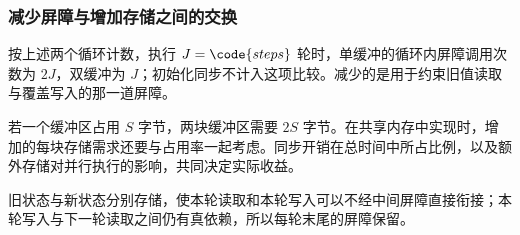 \subsubsection{减少屏障与增加存储之间的交换}
按上述两个循环计数，执行 $J=\code{steps}$ 轮时，单缓冲的循环内屏障调用次数为 $2J$，双缓冲为 $J$；初始化同步不计入这项比较。减少的是用于约束旧值读取与覆盖写入的那一道屏障。

若一个缓冲区占用 $S$ 字节，两块缓冲区需要 $2S$ 字节。在共享内存中实现时，增加的每块存储需求还要与占用率一起考虑。同步开销在总时间中所占比例，以及额外存储对并行执行的影响，共同决定实际收益。

\begin{keybox}[title={双缓冲保留的数据依赖}]
旧状态与新状态分别存储，使本轮读取和本轮写入可以不经中间屏障直接衔接；本轮写入与下一轮读取之间仍有真依赖，所以每轮末尾的屏障保留。
\end{keybox}
\FloatBarrier
